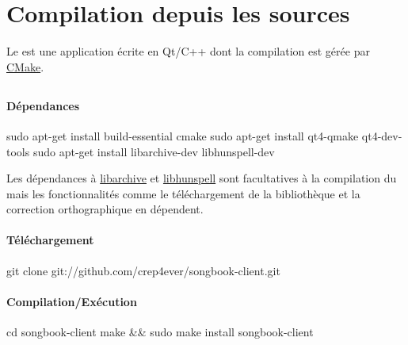 \section{Compilation depuis les sources}

Le \client est une application écrite en Qt/C++ dont la compilation
est gérée par \href{http://www.cmake.org}{CMake}.

\subsection{\linux}

\paragraph{Dépendances}

\begin{unix}
  sudo apt-get install build-essential cmake 
  sudo apt-get install qt4-qmake qt4-dev-tools
  sudo apt-get install libarchive-dev libhunspell-dev
\end{unix}

Les dépendances à
\href{http://code.google.com/p/libarchive/}{libarchive} et
\href{http://hunspell.sourceforge.net/}{libhunspell} sont facultatives
à la compilation du \client mais les fonctionnalités comme le
téléchargement de la bibliothèque et la correction orthographique en
dépendent.

\paragraph{Téléchargement}

\begin{unix}
  git clone git://github.com/crep4ever/songbook-client.git
\end{unix}

\paragraph{Compilation/Exécution}

\begin{unix}
  cd songbook-client
  make && sudo make install
  songbook-client
\end{unix}

